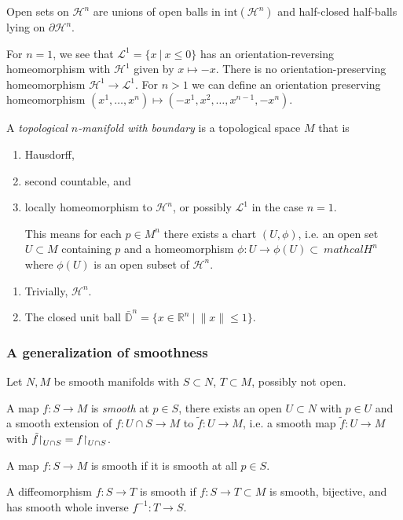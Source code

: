 Open sets on $\mathcal{H}^n$ are unions of open balls in
$\mathrm{int}(\mathcal{H}^n)$ and half-closed half-balls lying on
$\partial \mathcal{H}^n$.

For $n = 1$, we see that
$\mathcal{L}^1 = \{ x ~\vert~ x \leq 0 \}$ has an
orientation-reversing homeomorphism with $\mathcal{H}^1$
given by $x \mapsto -x$. There is no orientation-preserving
homeomorphism $\mathcal{H}^1 \to \mathcal{L}^1$. For
$n > 1$ we can define an orientation preserving homeomorphism
$(x^1, \dots, x^n) \mapsto (-x^1, x^2, \dots, x^{n-1}, -x^n)$.

\begin{defn}
A \emph{topological $n$-manifold with boundary} is a topological
space $M$ that is
\begin{enumerate}
  \item{
    Hausdorff,
  }
  \item{
    second countable, and
  }
  \item{
    locally homeomorphism to $\mathcal{H}^n$, or possibly
    $\mathcal{L}^1$ in the case $n = 1$.

    This means for each $p \in M^n$ there exists a chart
    $(U, \phi)$, i.e. an open set $U \subset M$ containing $p$ and a
    homeomorphism $\phi: U \to \phi(U) \subset\ mathcal{H}^n$ where
    $\phi(U)$ is an open subset of $\mathcal{H}^n$.
  }
\end{enumerate}
\end{defn}

\begin{xmpl}
  \begin{enumerate}
    \item{
      Trivially, $\mathcal{H}^n$.
    }
    \item{
      The closed unit ball
      $\bar{\mathbb{D}}^n = \{ x \in \mathbb{R}^n ~\vert~ \|x\| \leq 1 \}$.
    }
  \end{enumerate}
\end{xmpl}

\subsubsection{A generalization of smoothness}
Let $N, M$ be smooth manifolds with $S \subset N$,
$T \subset M$, possibly not open.

\begin{defn}
A map $f : S \to M$ is \emph{smooth} at $p \in S$, there
exists an open $U \subset N$ with $p \in U$ and a smooth extension of
$f: U \cap S \to M$ to $\tilde{f}: U \to M$, i.e. a smooth map
$\tilde{f}: U \to M$ with $\tilde{f}\mathord{\upharpoonright}_{U \cap S} =
f\mathord{\upharpoonright}_{U \cap S}$.

A map $f : S \to M$ is smooth if it is smooth
at all $p \in S$.

A diffeomorphism $f: S \to T$ is smooth if
$f: S \to T \subset M$ is smooth, bijective, and has smooth whole
inverse $f^{-1}: T \to S$.
\end{defn}


